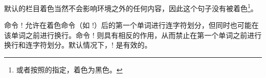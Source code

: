 默认的栏目着色当然不会影响环境之外的任何内容，因此这个句子没有被着色\footnote{或者按照的指定，着色为黑色。}。
% 
% 
% 

命令 \!! 允许在着色命令（如 \!\color!）后的第一个单词进行连字符划分，但同时也可能在该单词之前进行换行。命令 \!\nocoloredwordhyphenated! 则具有相反的作用，从而禁止在第一个单词之前进行换行和连字符划分。默认情况下，\!! 是有效的。

